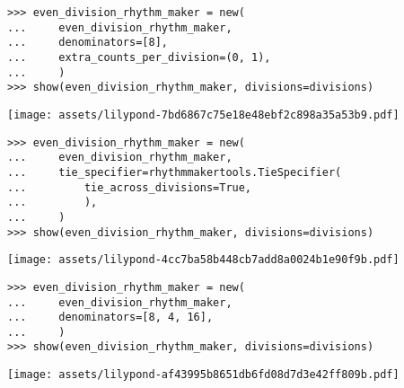 \begin{singlespacing}
\vspace{-0.5\baselineskip}
\begin{lstlisting}
>>> even_division_rhythm_maker = new(
...     even_division_rhythm_maker,
...     denominators=[8],
...     extra_counts_per_division=(0, 1),
...     )
>>> show(even_division_rhythm_maker, divisions=divisions)
\end{lstlisting}
\noindent\texttt{[image: assets/lilypond-7bd6867c75e18e48ebf2c898a35a53b9.pdf]}
\end{singlespacing}

\begin{comment}
<abjad>
even_division_rhythm_maker = new(
    even_division_rhythm_maker,
    tie_specifier=rhythmmakertools.TieSpecifier(
        tie_across_divisions=True,
        ),
    )
show(even_division_rhythm_maker, divisions=divisions)
</abjad>
\end{comment}

\begin{singlespacing}
\vspace{-0.5\baselineskip}
\begin{lstlisting}
>>> even_division_rhythm_maker = new(
...     even_division_rhythm_maker,
...     tie_specifier=rhythmmakertools.TieSpecifier(
...         tie_across_divisions=True,
...         ),
...     )
>>> show(even_division_rhythm_maker, divisions=divisions)
\end{lstlisting}
\noindent\texttt{[image: assets/lilypond-4cc7ba58b448cb7add8a0024b1e90f9b.pdf]}
\end{singlespacing}

\begin{comment}
<abjad>
even_division_rhythm_maker = new(
    even_division_rhythm_maker,
    denominators=[8, 4, 16],
    )
show(even_division_rhythm_maker, divisions=divisions)
</abjad>
\end{comment}

\begin{singlespacing}
\vspace{-0.5\baselineskip}
\begin{lstlisting}
>>> even_division_rhythm_maker = new(
...     even_division_rhythm_maker,
...     denominators=[8, 4, 16],
...     )
>>> show(even_division_rhythm_maker, divisions=divisions)
\end{lstlisting}
\noindent\texttt{[image: assets/lilypond-af43995b8651db6fd08d7d3e42ff809b.pdf]}
\end{singlespacing}

